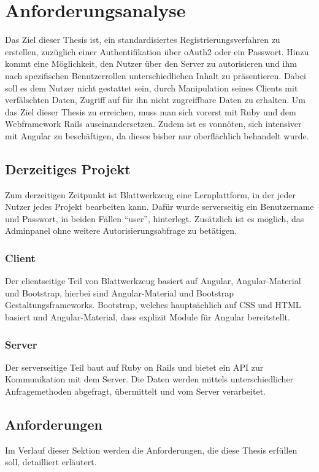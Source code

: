 \section{Anforderungsanalyse}
\label{sec: analyze}
Das Ziel dieser Thesis ist, ein standardisiertes Registrierungsverfahren zu erstellen, zuzüglich einer Authentifikation über \gls{oAuth2} oder ein Passwort. Hinzu kommt eine Möglichkeit, den Nutzer über den Server zu autorisieren und ihm nach spezifischen Benutzerrollen unterschiedlichen Inhalt zu präsentieren. Dabei soll es dem Nutzer nicht gestattet sein, durch Manipulation seines Clients mit verfälschten Daten, Zugriff auf für ihn nicht zugreiffbare Daten zu erhalten. Um das Ziel dieser Thesis zu erreichen, muss man sich vorerst mit Ruby und dem Webframework Rails auseinandersetzen. Zudem ist es vonnöten, sich intensiver mit Angular zu beschäftigen, da dieses bisher nur oberflächlich behandelt wurde.

\subsection{Derzeitiges Projekt}
\label{sec: current_project}
Zum derzeitigen Zeitpunkt ist Blattwerkzeug eine Lernplattform, in der jeder Nutzer jedes Projekt bearbeiten kann. Dafür wurde serverseitig ein Benutzername und Passwort, in beiden Fällen \enquote{user}, hinterlegt. Zusätzlich ist es möglich, das Adminpanel ohne weitere Autorisierungsabfrage zu betätigen.

\subsubsection{Client}
Der clientseitige Teil von Blattwerkzeug basiert auf Angular, Angular-Material und Bootstrap, hierbei sind Angular-Material und Bootstrap Gestaltungsframeworks. Bootstrap, welches hauptsächlich auf \gls{CSS} und \gls{HTML} basiert und Angular-Material, dass explizit Module für Angular bereitstellt.

\subsubsection{Server}
Der serverseitige Teil baut auf Ruby on Rails und bietet ein \gls{API} zur Kommunikation mit dem Server. Die Daten werden mittels unterschiedlicher Anfragemethoden abgefragt, übermittelt und vom Server verarbeitet.

\subsection{Anforderungen}
\label{sec: requirement}
Im Verlauf dieser Sektion werden die Anforderungen, die diese Thesis erfüllen soll, detailliert erläutert.

